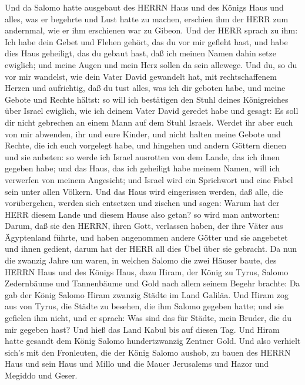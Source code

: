  Und da Salomo hatte ausgebaut des HERRN Haus und des Königs
Haus und alles, was er begehrte und Lust hatte zu machen, 
erschien ihm der HERR zum andernmal, wie er ihm erschienen war zu
Gibeon.  Und der HERR sprach zu ihm: Ich habe dein Gebet und
Flehen gehört, das du vor mir gefleht hast, und habe dies Haus
geheiligt, das du gebaut hast, daß ich meinen Namen dahin setze
ewiglich; und meine Augen und mein Herz sollen da sein allewege.
 Und du, so du vor mir wandelst, wie dein Vater David
gewandelt hat, mit rechtschaffenem Herzen und aufrichtig, daß du tust
alles, was ich dir geboten habe, und meine Gebote und Rechte hältst:
 so will ich bestätigen den Stuhl deines Königreiches über
Israel ewiglich, wie ich deinem Vater David geredet habe und gesagt: Es
soll dir nicht gebrechen an einem Mann auf dem Stuhl Israels.
 Werdet ihr aber euch von mir abwenden, ihr und eure Kinder,
und nicht halten meine Gebote und Rechte, die ich euch vorgelegt habe,
und hingehen und andern Göttern dienen und sie anbeten:  so
werde ich Israel ausrotten von dem Lande, das ich ihnen gegeben habe;
und das Haus, das ich geheiligt habe meinem Namen, will ich verwerfen
von meinem Angesicht; und Israel wird ein Sprichwort und eine Fabel sein
unter allen Völkern.  Und das Haus wird eingerissen werden,
daß alle, die vorübergehen, werden sich entsetzen und zischen und sagen:
Warum hat der HERR diesem Lande und diesem Hause also getan?
 so wird man antworten: Darum, daß sie den HERRN, ihren
Gott, verlassen haben, der ihre Väter aus Ägyptenland führte, und haben
angenommen andere Götter und sie angebetet und ihnen gedient, darum hat
der HERR all dies Übel über sie gebracht.  Da nun die
zwanzig Jahre um waren, in welchen Salomo die zwei Häuser baute, des
HERRN Haus und des Königs Haus,  dazu Hiram, der König zu
Tyrus, Salomo Zedernbäume und Tannenbäume und Gold nach allem seinem
Begehr brachte: Da gab der König Salomo Hiram zwanzig Städte im Land
Galiläa.  Und Hiram zog aus von Tyrus, die Städte zu
besehen, die ihm Salomo gegeben hatte; und sie gefielen ihm nicht,
 und er sprach: Was sind das für Städte, mein Bruder, die
du mir gegeben hast? Und hieß das Land Kabul bis auf diesen Tag.
 Und Hiram hatte gesandt dem König Salomo hundertzwanzig
Zentner Gold.  Und also verhielt sich's mit den Fronleuten,
die der König Salomo aushob, zu bauen des HERRN Haus und sein Haus und
Millo und die Mauer Jerusalems und Hazor und Megiddo und Geser.
